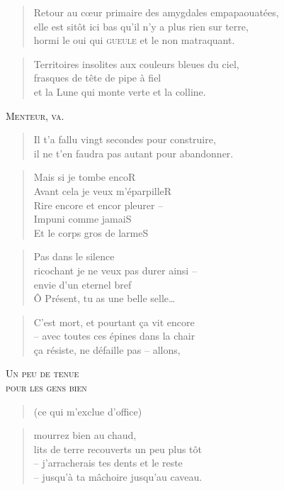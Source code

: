   \begin{verse}
    Retour au cœur primaire des amygdales empapaouatées,\\
    elle est sitôt ici bas qu’il n’y a plus rien sur terre,\\
    hormi le oui qui \textsc{gueule} et le non matraquant.\\
  \end{verse}
  \begin{verse}
    Territoires insolites aux couleurs bleues du ciel,\\
    frasques de tête de pipe à fiel\\
    et la Lune qui monte verte et la colline.
  \end{verse}
  \begin{center}
    \textsc{Menteur, va.}
  \end{center}
  \begin{verse}
    Il t’a fallu vingt secondes pour construire,\\
    il ne t’en faudra pas autant pour abandonner.
  \end{verse}
  \begin{verse}
    Mais si je tombe encoR\\
    Avant cela je veux m’éparpilleR\\
    Rire encore et encor pleurer --\\
    Impuni comme jamaiS\\
    Et le corps gros de larmeS
  \end{verse}
  \begin{verse}
    Pas dans le silence\\
    ricochant je ne veux pas durer ainsi --\\
    envie d’un eternel bref\\
    Ô Présent, tu as une belle selle…
  \end{verse}
  \begin{verse}
    C’est mort, et pourtant ça vit encore\\
    -- avec toutes ces épines dans la chair\\
    ça résiste, ne défaille pas -- allons,
  \end{verse}
  \begin{center}
    \textsc{Un peu de tenue}\\
    \textsc{pour les gens bien}
  \end{center}
  \begin{verse}
    (ce qui m’exclue d’office)
  \end{verse}
  \begin{verse}
    mourrez bien au chaud,\\
    lits de terre recouverts un peu plus tôt\\
    -- j’arracherais tes dents et le reste\\
    -- jusqu’à ta mâchoire jusqu’au caveau.
  \end{verse}
